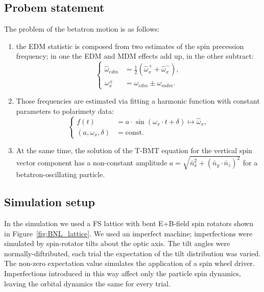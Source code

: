 \documentclass[]{elsarticle}
\newcommand{\w}{\omega}
\newcommand{\nbar}{\bar n}
\newcommand{\const}{\mathrm{const}}
\begin{document}
\subsection{Probem statement}
The problem of the betatron motion is as follows:
\begin{enumerate}
\item the EDM statistic is composed from two estimates of the spin precession frequency;
  in one the EDM and MDM effects add up, in the other subtract:
  \begin{equation*}
    \begin{cases}
      \hat\w_{edm} &= \frac12(\hat\w_x^+ + \hat\w_x^-),\\
      \w_x^\pm &= \w_{edm} \pm \w_{mdm}.
    \end{cases}
  \end{equation*}
\item Those frequencies are estimated via fitting a harmonic function with constant parameters to
  polarimety data:
  \begin{equation*}
    \begin{cases}
      f(t) &= a\cdot\sin(\w_x\cdot t + \delta)\mapsto \hat\w_x,\\
      (a,\w_x,\delta) &= \const.
    \end{cases}
  \end{equation*}
\item At the same time, the solution of the T-BMT equation for the vertical spin vector component
  has a non-constant amplitude $a = \sqrt{\nbar_x^2 + (\nbar_y\cdot\nbar_z)^2}$
  for a betatron-oscillating particle.
\end{enumerate}

\subsection{Simulation setup}
In the simulation we used a FS lattice with bent E+B-field spin rotators
shown in Figure~\ref{fig:BNL_lattice}.
We used an imperfect machine; imperfections were simulated by spin-rotator tilts about the optic axis.
The tilt angles were normally-diftributed, each trial the expectation of the tilt distribution was varied.
The non-zero expectation value simulates the application of a spin wheel driver.
Imperfections introduced in this way affect only the particle spin dynamics,
leaving the orbital dynamics the same for every trial.
\end{document}

